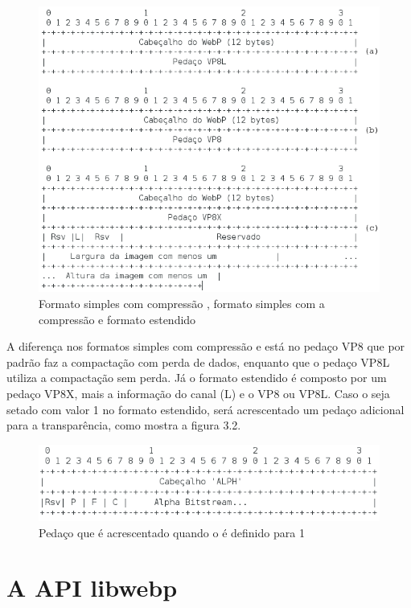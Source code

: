 \documentclass[espaco=simples,appendix=Name]{abnt}
\begin{document}
\begin{figure}[h]
  \centering
    \includegraphics[scale=0.5]{LossyLossLessExtended.png}
  \caption{Formato simples com compressão , formato simples com a compressão  e formato estendido \cite{WebPContainer}}
\end{figure}

A diferença nos formatos simples com compressão  e  está no pedaço VP8 que por padrão faz a compactação com perda de dados, enquanto que o pedaço VP8L utiliza a compactação sem perda. Já o formato estendido é composto por um pedaço VP8X, mais a informação do canal  (L) e o  VP8 ou VP8L. Caso o  seja setado com valor 1 no formato estendido, será acrescentado um pedaço adicional para a transparência, como mostra a figura 3.2.

\begin{figure}[h]
  \centering
    \includegraphics[scale=0.4]{AlphaChunk.png}
  \caption{Pedaço que é acrescentado quando o  é definido para 1}
\end{figure}

\section{A API libwebp}
\end{document}
